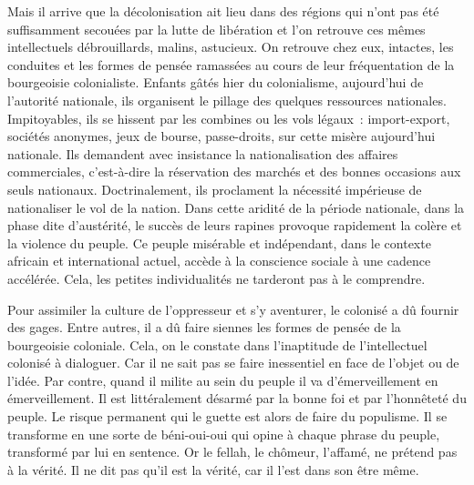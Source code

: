 \documentclass[french,twoside]{book} %
\begin{document}
Mais il arrive que la décolonisation ait lieu dans des régions qui n’ont pas été suffisamment secouées par la lutte de libération et l’on retrouve ces mêmes intellectuels débrouillards, malins, astucieux. On retrouve chez eux, intactes, les conduites et les formes de pensée ramassées au cours de leur fréquentation de la bourgeoisie colonialiste. Enfants gâtés hier du colonialisme, aujourd’hui de l’autorité nationale, ils organisent le pillage des quelques ressources nationales. Impitoyables, ils se hissent par les combines ou les vols légaux : import-export, sociétés anonymes, jeux de bourse, passe-droits, sur cette misère aujourd’hui nationale. Ils demandent avec insistance la nationalisation des affaires commerciales, c’est-à-dire la réservation des marchés et des bonnes occasions aux seuls nationaux. Doctrinalement, ils proclament la nécessité impérieuse de nationaliser le vol de la nation. Dans cette aridité de la période nationale,   dans la phase dite d’austérité, le succès de leurs rapines provoque rapidement la colère et la violence du peuple. Ce peuple misérable et indépendant, dans le contexte africain et international actuel, accède à la conscience sociale à une cadence accélérée. Cela, les petites individualités ne tarderont pas à le comprendre.\par
\bigbreak
\noindent Pour assimiler la culture de l’oppresseur et s’y aventurer, le colonisé a dû fournir des gages. Entre autres, il a dû faire siennes les formes de pensée de la bourgeoisie coloniale. Cela, on le constate dans l’inaptitude de l’intellectuel colonisé à dialoguer. Car il ne sait pas se faire inessentiel en face de l’objet ou de l’idée. Par contre, quand il milite au sein du peuple il va d’émerveillement en émerveillement. Il est littéralement désarmé par la bonne foi et par l’honnêteté du peuple. Le risque permanent qui le guette est alors de faire du populisme. Il se transforme en une sorte de béni-oui-oui qui opine à chaque phrase du peuple, transformé par lui en sentence. Or le fellah, le chômeur, l’affamé, ne prétend pas à la vérité. Il ne dit pas qu’il est la vérité, car il l’est dans son être même.\par
\end{document}
